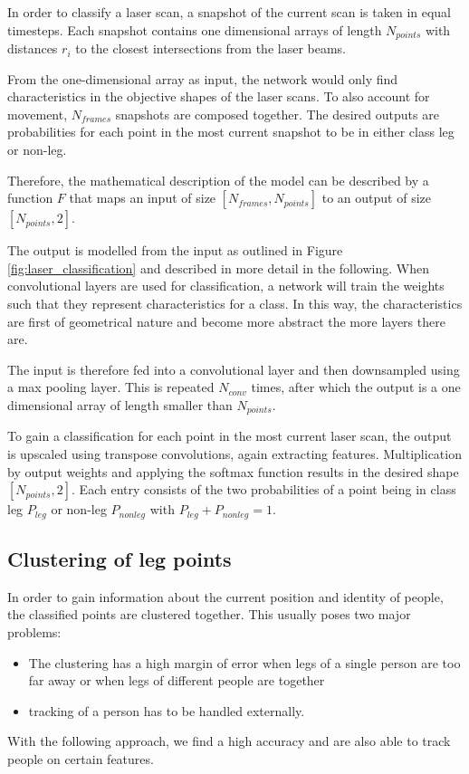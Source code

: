 In order to classify a laser scan, a snapshot of the current scan is taken in equal timesteps. Each snapshot contains one dimensional arrays of length $N_{points}$ with distances $r_i$ to the closest intersections from the laser beams.

From the one-dimensional array as input, the network would only find characteristics in the objective shapes of the laser scans. To also account for movement, $N_{frames}$ snapshots are composed together.
The desired outputs are probabilities for each point in the most current snapshot to be in either class leg or non-leg.

Therefore, the mathematical description of the model can be described by a function $F$ that maps an input of size $[N_{frames}, N_{points}]$ to an output of size $[N_{points}, 2]$.

The output is modelled from the input as outlined in Figure \ref{fig:laser_classification} and described in more detail in the following.
When convolutional layers are used for classification, a network will train the weights such that they represent characteristics for a class. In this way, the characteristics are first of geometrical nature and become more abstract the more layers there are.

The input is therefore fed into a convolutional layer and then downsampled using a max pooling layer. This is repeated $N_{conv}$ times, after which the output is a one dimensional array of length smaller than $N_{points}$.

To gain a classification for each point in the most current laser scan, the output is upscaled using transpose convolutions, again extracting features. Multiplication by output weights and applying the softmax function results in the desired shape $[N_{points}, 2]$. Each entry consists of the two probabilities of a point being in class leg $P_{leg}$ or non-leg $P_{nonleg}$ with $P_{leg} + P_{nonleg} = 1$.



\subsection{Clustering of leg points}

In order to gain information about the current position and identity of people, the classified points are clustered together. This usually poses two major problems:
\begin{itemize}
\item The clustering has a high margin of error when legs of a single person are too far away or when legs of different people are together
\item tracking of a person has to be handled externally.
\end{itemize} 
With the following approach, we find a high accuracy and are also able to track people on certain features.


